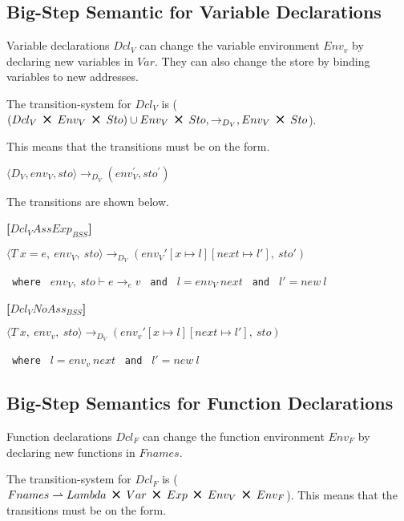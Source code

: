 \subsection{Big-Step Semantic for Variable Declarations}
Variable declarations $Dcl_V$ can change the variable environment $Env_v$ by declaring new variables in $Var$.
They can also change the store by binding variables to new addresses.

The transition-system for $Dcl_V$ is ($(Dcl_V\ \Cross\ Env_V\ \Cross\ Sto) \cup Env_V\ \Cross\ Sto, \rightarrow_{D_{V}}, Env_V\ \Cross\ Sto$).

This means that the transitions must be on the form.

\begin{center}
	$\langle D_V,env_V,sto \rangle \rightarrow_{D_V} (env_V^{'} , sto^{'})$
\end{center}

The transitions are shown below.

\textbf{[$Dcl_VAssExp_{BSS}$]}\\
\begin{center}
	\begin{math}
		{\langle T\ x = e,\ env_V,\ sto \rangle \rightarrow_{D_V} (env_V'[x \mapsto l][next \mapsto l'],\ sto')}
	\end{math}
	
	\texttt{ where } $env_V,\ sto \vdash e \rightarrow_e v$
	\texttt{ and } $l = env_V\ next$
	\texttt{ and } $l' = new\ l$
\end{center}

\textbf{[$Dcl_VNoAss_{BSS}$]}\\
\begin{center}
	\begin{math}
		{\langle T\ x,\ env_v,\ sto \rangle \rightarrow_{D_V} (env_v'[x \mapsto l][next \mapsto l'],\ sto)}
	\end{math}
	
	\texttt{ where } $l = env_v\ next$
	\texttt{ and } $l' = new\ l$
\end{center}

\subsection{Big-Step Semantics for Function Declarations}
Function declarations $Dcl_F$ can change the function environment $Env_F$ by declaring new functions in $Fnames$.

The transition-system for $Dcl_F$ is ($Fnames \rightharpoonup Lambda\ \Cross\ Var\ \Cross\ Exp\ \Cross\ Env_V\ \Cross\ Env_F$).
This means that the transitions must be on the form.

